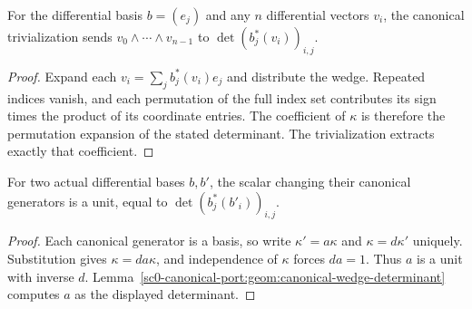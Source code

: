 \begin{lemma}
\label{sc0-canonical-port:geom:canonical-wedge-determinant}
\leanok
For the differential basis \(b=(e_j)\) and any \(n\) differential
vectors \(v_i\), the canonical trivialization sends
\(v_0\wedge\cdots\wedge v_{n-1}\) to
\(\det(b_j^*(v_i))_{i,j}\).
\end{lemma}
\begin{proof}
Expand each \(v_i=\sum_j b_j^*(v_i)e_j\) and distribute the
wedge. Repeated indices vanish, and each permutation of the full
index set contributes its sign times the product of its coordinate
entries. The coefficient of \(\kappa\) is therefore the
permutation expansion of the stated determinant. The trivialization
extracts exactly that coefficient.
\end{proof}

\begin{lemma}
\label{sc0-canonical-port:geom:canonical-transition-unit}
\leanok
For two actual differential bases \(b,b'\), the scalar changing
their canonical generators is a unit, equal to
\(\det(b_j^*(b'_i))_{i,j}\).
\end{lemma}
\begin{proof}
Each canonical generator is a basis, so write
\(\kappa'=a\kappa\) and \(\kappa=d\kappa'\) uniquely.
Substitution gives \(\kappa=da\kappa\), and independence of
\(\kappa\) forces \(da=1\). Thus \(a\) is a unit with inverse
\(d\). Lemma~\ref{sc0-canonical-port:geom:canonical-wedge-determinant} computes
\(a\) as the displayed determinant.
\end{proof}


